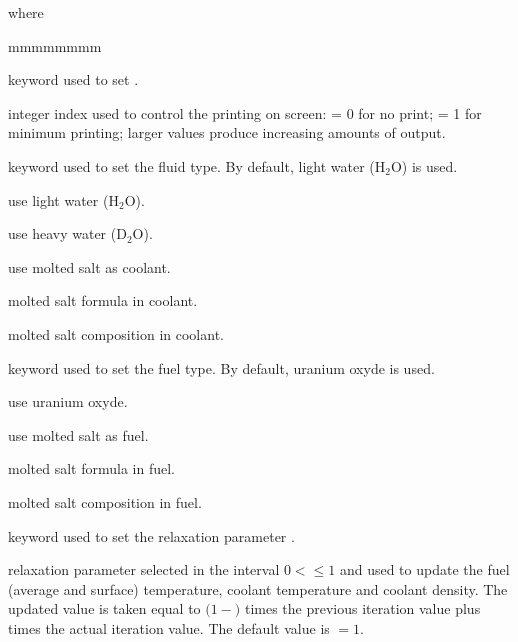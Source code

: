 \noindent where
\begin{ListeDeDescription}{mmmmmmmm}

\item[\moc{EDIT}] keyword used to set .

\item[\dusa{iprint}] integer index used to control the printing on screen:
= 0 for no print; = 1 for minimum printing; larger values produce
increasing amounts of output.

\item[\moc{FLUID}] keyword used to set the fluid type. By default, light water (H$_2$O) is used.

\item[\moc{H2O}] use light water (H$_2$O).

\item[\moc{D2O}] use heavy water (D$_2$O).

\item[\moc{SALT}] use molted salt as coolant.

\item[\dusa{sname}] molted salt formula in coolant.

\item[\dusa{scomp}] molted salt composition in coolant.

\item[\moc{FUEL}] keyword used to set the fuel type. By default, uranium oxyde is used.

\item[\moc{UOX}] use uranium oxyde.

\item[\moc{SALT}] use molted salt as fuel.

\item[\dusa{fname}] molted salt formula in fuel.

\item[\dusa{fcomp}] molted salt composition in fuel.

\item[\moc{RELAX}] keyword used to set the relaxation parameter .

\item[\dusa{relax}] relaxation parameter selected in the interval $0<$$\le 1$ and used to update
the fuel (average and surface) temperature, coolant temperature and coolant density. The updated value is taken equal to
$(1-$$)$ times the previous iteration value plus  times the actual iteration value. The default
value is $=1$.


\end{ListeDeDescription}
